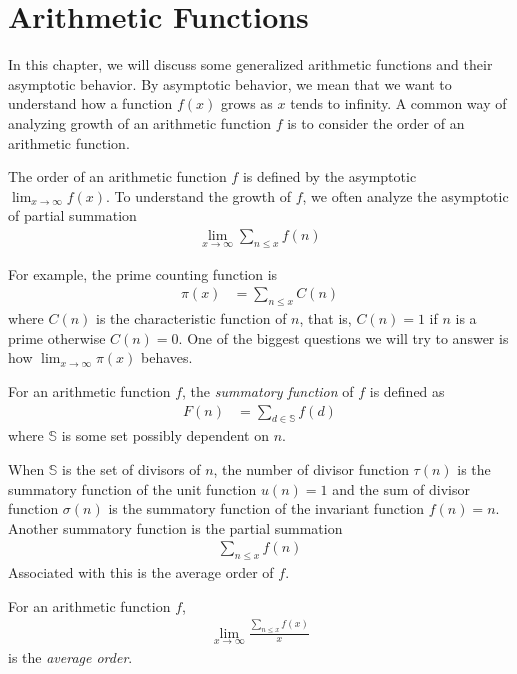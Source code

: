 \documentclass[elemannt.tex]{subfile}
\begin{document}
	\chapter{Arithmetic Functions}\label{ch:arith}
	In this chapter, we will discuss some generalized arithmetic functions and their asymptotic behavior. By asymptotic behavior, we mean that we want to understand how a function $f(x)$ grows as $x$ tends to infinity. A common way of analyzing growth of an arithmetic function $f$ is to consider the order of an arithmetic function.
		\begin{definition}
			The order of an arithmetic function $f$ is defined by the asymptotic $\lim_{x\to\infty}f(x)$. To understand the growth of $f$, we often analyze the asymptotic of partial summation
				\begin{align*}
					\lim\limits_{x\to\infty}\sum_{n\leq x}f(n)
				\end{align*}
		\end{definition}
	For example, the prime counting function is
		\begin{align*}
			\pi(x)
				& = \sum_{n\leq x}C(n)
		\end{align*}
	where $C(n)$ is the characteristic function of $n$, that is, $C(n)=1$ if $n$ is a prime otherwise $C(n)=0$. One of the biggest questions we will try to answer is how $\lim_{x\to\infty}\pi(x)$ behaves.
		\begin{definition}
			For an arithmetic function $f$, the \textit{summatory function} of $f$ is defined as
				\begin{align*}
					F(n)
						& = \sum_{d\in \mathbb{S}}f(d)
				\end{align*}
			where $\mathbb{S}$ is some set possibly dependent on $n$.
		\end{definition}
	When $\mathbb{S}$ is the set of divisors of $n$, the number of divisor function $\tau(n)$ is the summatory function of the unit function $u(n)=1$ and the sum of divisor function $\sigma(n)$ is the summatory function of the invariant function $f(n)=n$. Another summatory function is the partial summation
		\begin{align*}
			\sum_{n\leq x}f(n)
		\end{align*}
	Associated with this is the average order of $f$.
		\begin{definition}
			 For an arithmetic function $f$,
				\begin{align*}
					\lim\limits_{x\to\infty}\frac{\sum_{n\leq x}f(x)}{x}
				\end{align*}
			is the \textit{average order}.
		\end{definition}
\end{document}
